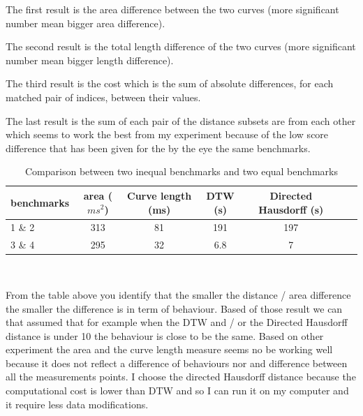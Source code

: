 \documentclass{article}
\begin{document}
The first result is the area difference between the two curves (more significant number mean bigger area difference).

The second result is the total length difference of the two curves (more significant number mean bigger length difference).

The third result is the cost which is the sum of absolute differences, for each matched pair of indices, between their values.

The last result is the sum of each pair of the distance subsets are from each other which seems to work the best from my experiment because of the low score difference that has been given for the by the eye the same benchmarks.

\begin{table}[h!]
\begin{tabular}{|l|c|c|c|c|c|c|}
   \hline
   benchmarks  & area ($ms^2$) & Curve length (ms) & DTW (s) & Directed Hausdorff (s) \\
   \hline
   1 \&  2 & 313 & 81 & 191 & 197\\
   \hline
   3 \& 4  & 295 & 32 & 6.8  & 7 \\
   \hline
\end{tabular} \\ 
\caption{Comparison between two inequal benchmarks and two equal benchmarks}
\label{result}
\end{table}

From the table above you identify that the smaller the distance / area difference the smaller the difference is in term of behaviour. Based of those result we can that assumed that for example when the DTW and / or the Directed Hausdorff distance is under 10 the behaviour is close to be the same. Based on other experiment the area and the curve length measure seems no be working well because it does not reflect a difference of behaviours nor and difference between all the measurements points. I choose the directed Hausdorff distance because the computational cost is lower than DTW and so I can run it on my computer and it require less data modifications.
\end{document}
